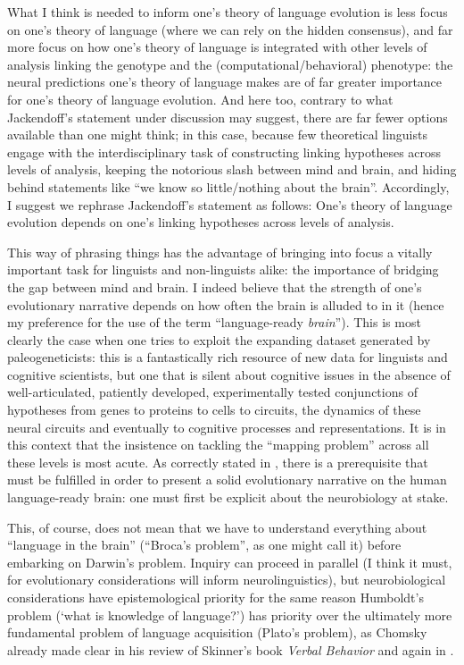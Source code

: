 What I think is needed to inform one's theory of language evolution is less focus on one's theory of language (where we can rely on the hidden consensus), and far more focus on how one's theory of language is integrated with other levels of analysis linking the genotype and the (computational/behavioral) phenotype: the neural predictions one's theory of language makes are of far greater importance for one's theory of language evolution. And here too, contrary to what Jackendoff's statement under discussion may suggest, there are far fewer options available than one might think; in this case, because few theoretical linguists engage with the interdisciplinary task of constructing linking hypotheses across levels of analysis, keeping the notorious slash between mind and brain, and hiding behind statements like ``we know so little/nothing about the brain''. Accordingly, I suggest we rephrase Jackendoff's statement as follows: One's theory of language evolution depends on one's linking hypotheses across levels of analysis.

This way of phrasing things has the advantage of bringing into focus a vitally important task for linguists and non-linguists alike: the importance of bridging the gap between mind and brain. I indeed believe that the strength of one's evolutionary narrative depends on
how often the brain is alluded to in it (hence my preference for the use of the term ``language-ready \textit{brain}''). This is most clearly the case when one tries to exploit the expanding dataset generated by paleogeneticists: this is a fantastically rich resource of new data for linguists and cognitive scientists, but one that is silent about cognitive issues in the absence of well-articulated, patiently developed, experimentally tested conjunctions of hypotheses from genes to proteins to cells to circuits, the dynamics of these neural circuits and eventually to cognitive processes and representations. It is in this context that the insistence on tackling the ``mapping problem'' \citep{fisher2015translating,poeppel2012maps} across all these levels is most acute. As correctly stated in \cite{hagoort2018prerequisites}, there is a prerequisite that must be fulfilled in order to present a solid evolutionary narrative on the human language-ready brain: one must first be explicit about the neurobiology at stake.

This, of course, does not mean that we have to understand everything about ``language in the brain'' (``Broca's problem'', as one might call it) before embarking on Darwin's problem. Inquiry can proceed in parallel (I think it must, for evolutionary considerations will inform neurolinguistics), but neurobiological considerations have epistemological priority for the same reason Humboldt's problem (`what is knowledge of language?') has priority over the ultimately more fundamental problem of language acquisition (Plato's problem), as Chomsky already made clear in his review of Skinner's book \textit{Verbal Behavior} \citep{chomsky1959chomsky} and again in \cite{chomsky1986knowledge}.

